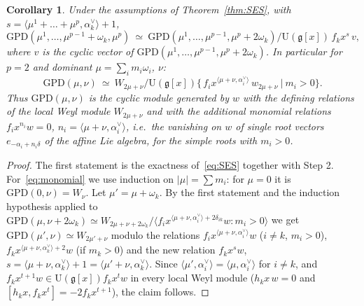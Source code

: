 \documentclass[11pt]{amsart}
\numberwithin{equation}{section}
\newtheorem{corollary}[equation]{Corollary}
\theoremstyle{definition}
\newcommand{\fg}{\mathfrak{g}}
\newcommand{\U}{\mathrm{U}}
\newcommand{\GPD}{\mathrm{GPD}}         %
\begin{document}
	
	\begin{corollary}\label{cor:monomial}
		Under the assumptions of Theorem~\ref{thm:SES}, with $s=\langle\mu^1+\dots+\mu^p,\alpha_k^\vee\rangle+1$,
		\[
		\GPD(\mu^1,\dots,\mu^{p-1}+\omega_k,\mu^p)\ \simeq\ \GPD(\mu^1,\dots,\mu^{p-1},\mu^p+2\omega_k)\Big/\U(\fg[x])\,f_kx^{s}\,v ,
		\]
		where $v$ is the cyclic vector of $\GPD(\mu^1,\dots,\mu^{p-1},\mu^p+2\omega_k)$. In particular for $p=2$ and dominant $\mu=\sum_i m_i\omega_i$, $\nu$:
		\begin{equation}\label{eq:monomial}
			\GPD(\mu,\nu)\ \simeq\ W_{2\mu+\nu}\Big/\U(\fg[x])\Big\{\,f_ix^{\langle\mu+\nu,\alpha_i^\vee\rangle}\,w_{2\mu+\nu}\ \Big|\ m_i>0\Big\}.
		\end{equation}
		Thus $\GPD(\mu,\nu)$ is the cyclic module generated by $w$ with the defining relations of the local Weyl module $W_{2\mu+\nu}$ and with the additional monomial relations $f_ix^{n_i}w=0$, $n_i=\langle\mu+\nu,\alpha_i^\vee\rangle$, i.e.\ the vanishing on $w$ of single root vectors $e_{-\alpha_i+n_i\delta}$ of the affine Lie algebra, for the simple roots with $m_i>0$.
	\end{corollary}
	\begin{proof}
		The first statement is the exactness of~\eqref{eq:SES} together with Step 2. For~\eqref{eq:monomial} we use induction on $|\mu|=\sum m_i$: for $\mu=0$ it is $\GPD(0,\nu)=W_\nu$. Let $\mu'=\mu+\omega_k$. By the first statement and the induction hypothesis applied to $\GPD(\mu,\nu+2\omega_k)\simeq W_{2\mu+\nu+2\omega_k}/\langle f_ix^{\langle\mu+\nu,\alpha_i^\vee\rangle+2\delta_{ik}}w:m_i>0\rangle$ we get $\GPD(\mu',\nu)\simeq W_{2\mu'+\nu}$ modulo the relations $f_ix^{\langle\mu+\nu,\alpha_i^\vee\rangle}w$ ($i\ne k$, $m_i>0$), $f_kx^{\langle\mu+\nu,\alpha_k^\vee\rangle+2}w$ (if $m_k>0$) and the new relation $f_kx^{s}w$, $s=\langle\mu+\nu,\alpha_k^\vee\rangle+1=\langle\mu'+\nu,\alpha_k^\vee\rangle$. Since $\langle\mu',\alpha_i^\vee\rangle=\langle\mu,\alpha_i^\vee\rangle$ for $i\ne k$, and $f_kx^{t+1}w\in\U(\fg[x])f_kx^tw$ in every local Weyl module ($h_kx\,w=0$ and $[h_kx,f_kx^t]=-2f_kx^{t+1}$), the claim follows.
	\end{proof}
	
\end{document}
